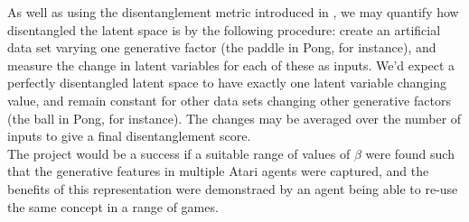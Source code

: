 \documentclass[12pt,twoside]{article}
\begin{document}
As well as using the disentanglement metric introduced in \cite{Higgins2016}, we may quantify how disentangled the latent space is by the following procedure: create an artificial data set varying one generative factor (the paddle in Pong, for instance), and measure the change in latent variables for each of these as inputs. We'd expect a perfectly disentangled latent space to have exactly one latent variable changing value, and remain constant for other data sets changing other generative factors (the ball in Pong, for instance). The changes may be averaged over the number of inputs to give a final disentanglement score.\\

The project would be a success if a suitable range of values of $\beta$ were found such that the generative features in multiple Atari agents were captured, and the benefits of this representation were demonstraed by an agent being able to re-use the same concept in a range of games.

\newpage

\end{document}
